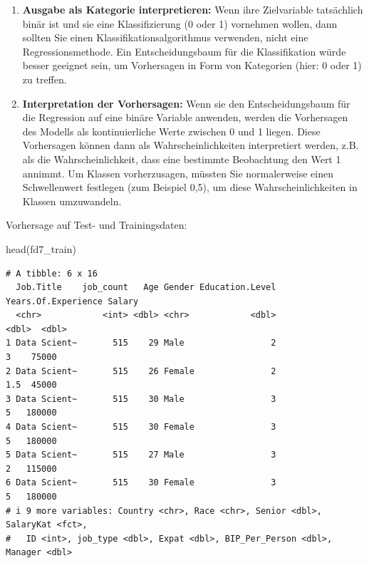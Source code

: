 \documentclass[
  letterpaper,
  DIV=11,
  numbers=noendperiod]{scrartcl}
\newenvironment{Shaded}{\begin{snugshade}}{\end{snugshade}}
\newcommand{\FunctionTok}[1]{\textcolor[rgb]{0.28,0.35,0.67}{#1}}
\newcommand{\NormalTok}[1]{\textcolor[rgb]{0.00,0.23,0.31}{#1}}
\begin{document}
\begin{enumerate}
\def\labelenumi{\arabic{enumi}.}
\item
  \textbf{Ausgabe als Kategorie interpretieren:} Wenn ihre Zielvariable
  tatsächlich binär ist und sie eine Klassifizierung (0 oder 1)
  vornehmen wollen, dann sollten Sie einen Klassifikationsalgorithmus
  verwenden, nicht eine Regressionsmethode. Ein Entscheidungsbaum für
  die Klassifikation würde besser geeignet sein, um Vorhersagen in Form
  von Kategorien (hier: 0 oder 1) zu treffen.
\item
  \textbf{Interpretation der Vorhersagen:} Wenn sie den
  Entscheidungsbaum für die Regression auf eine binäre Variable
  anwenden, werden die Vorhersagen des Modells als kontinuierliche Werte
  zwischen 0 und 1 liegen. Diese Vorhersagen können dann als
  Wahrscheinlichkeiten interpretiert werden, z.B. als die
  Wahrscheinlichkeit, dass eine bestimmte Beobachtung den Wert 1
  annimmt. Um Klassen vorherzusagen, müssten Sie normalerweise einen
  Schwellenwert festlegen (zum Beispiel 0,5), um diese
  Wahrscheinlichkeiten in Klassen umzuwandeln.
\end{enumerate}

Vorhersage auf Test- und Trainingsdaten:

\begin{Shaded}
\begin{Highlighting}[]
\FunctionTok{head}\NormalTok{(fd7\_train)}
\end{Highlighting}
\end{Shaded}

\begin{verbatim}
# A tibble: 6 x 16
  Job.Title    job_count   Age Gender Education.Level Years.Of.Experience Salary
  <chr>            <int> <dbl> <chr>            <dbl>               <dbl>  <dbl>
1 Data Scient~       515    29 Male                 2                 3    75000
2 Data Scient~       515    26 Female               2                 1.5  45000
3 Data Scient~       515    30 Male                 3                 5   180000
4 Data Scient~       515    30 Female               3                 5   180000
5 Data Scient~       515    27 Male                 3                 2   115000
6 Data Scient~       515    30 Female               3                 5   180000
# i 9 more variables: Country <chr>, Race <chr>, Senior <dbl>, SalaryKat <fct>,
#   ID <int>, job_type <dbl>, Expat <dbl>, BIP_Per_Person <dbl>, Manager <dbl>
\end{verbatim}
\end{document}
